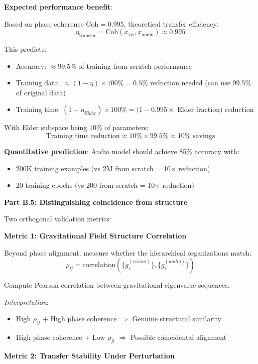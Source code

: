 \textbf{Expected performance benefit}:

Based on phase coherence $\text{Coh} = 0.995$, theoretical transfer efficiency:
$$\eta_{\text{transfer}} = \text{Coh}(x_{\text{vis}}, x_{\text{audio}}) \approx 0.995$$

This predicts:
\begin{itemize}
\item Accuracy: $\approx 99.5\%$ of training from scratch performance
\item Training data: $\approx (1 - \eta) \times 100\% = 0.5\%$ reduction needed (can use 99.5\% of original data)
\item Training time: $(1 - \eta_{Elder}) \times 100\% = (1 - 0.995 \times$ Elder fraction$)$ reduction
\end{itemize}

With Elder subspace being 10\% of parameters:
$$\text{Training time reduction} \approx 10\% \times 99.5\% \approx 10\% \text{ savings}$$

\textbf{Quantitative prediction}: Audio model should achieve 85\% accuracy with:
\begin{itemize}
\item 200K training examples (vs 2M from scratch = 10× reduction)
\item 20 training epochs (vs 200 from scratch = 10× reduction)
\end{itemize}

\textbf{Part B.5: Distinguishing coincidence from structure}

Two orthogonal validation metrics:

\textbf{Metric 1: Gravitational Field Structure Correlation}

Beyond phase alignment, measure whether the hierarchical organizations match:
$$\rho_{\mathcal{G}} = \text{correlation}(\{g_i^{(vision)}\}, \{g_i^{(audio)}\})$$

Compute Pearson correlation between gravitational eigenvalue sequences.

\textit{Interpretation}:
\begin{itemize}
\item High $\rho_{\mathcal{G}}$ + High phase coherence $\Rightarrow$ Genuine structural similarity
\item High phase coherence + Low $\rho_{\mathcal{G}}$ $\Rightarrow$ Possible coincidental alignment
\end{itemize}

\textbf{Metric 2: Transfer Stability Under Perturbation}

